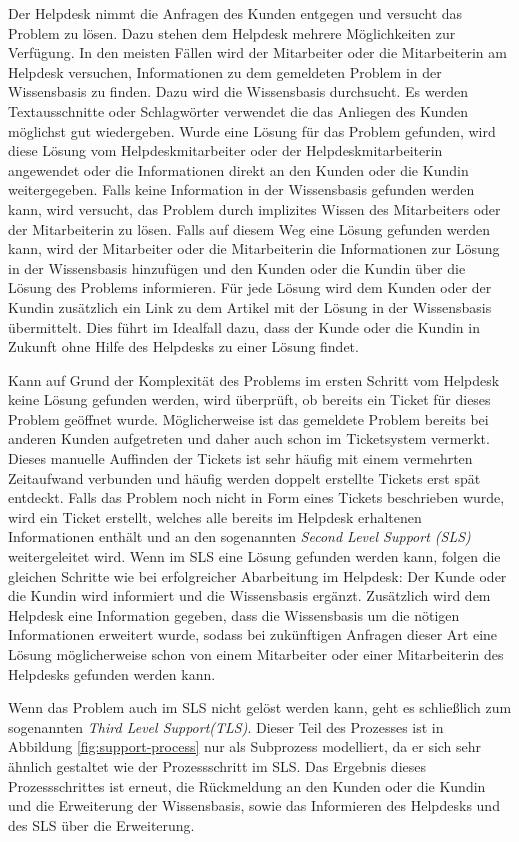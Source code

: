 Der Helpdesk nimmt die Anfragen des Kunden entgegen und versucht das Problem zu lösen. Dazu stehen dem Helpdesk mehrere Möglichkeiten zur Verfügung. In den meisten Fällen wird der Mitarbeiter oder die Mitarbeiterin am Helpdesk versuchen, Informationen zu dem gemeldeten Problem in der Wissensbasis zu finden. Dazu wird die Wissensbasis durchsucht. Es werden Textausschnitte oder Schlagwörter verwendet die das Anliegen des Kunden möglichst gut wiedergeben. Wurde eine Lösung für das Problem gefunden, wird diese Lösung vom Helpdeskmitarbeiter oder der Helpdeskmitarbeiterin angewendet oder die Informationen direkt an den Kunden oder die Kundin weitergegeben. Falls keine Information in der Wissensbasis gefunden werden kann, wird versucht, das Problem durch implizites Wissen des Mitarbeiters oder der Mitarbeiterin zu lösen. Falls auf diesem Weg eine Lösung gefunden werden kann, wird der Mitarbeiter oder die Mitarbeiterin die Informationen zur Lösung in der Wissensbasis hinzufügen und den Kunden oder die Kundin über die Lösung des Problems informieren. Für jede Lösung wird dem Kunden oder der Kundin zusätzlich ein Link zu dem Artikel mit der Lösung in der Wissensbasis übermittelt. Dies führt im Idealfall dazu, dass der Kunde oder die Kundin in Zukunft ohne Hilfe des Helpdesks zu einer Lösung findet.

Kann auf Grund der Komplexität des Problems im ersten Schritt vom Helpdesk keine Lösung gefunden werden, wird überprüft, ob bereits ein Ticket für dieses Problem geöffnet wurde. Möglicherweise ist das gemeldete Problem bereits bei anderen Kunden aufgetreten und daher auch schon im Ticketsystem vermerkt. Dieses manuelle Auffinden der Tickets ist sehr häufig mit einem vermehrten Zeitaufwand verbunden und häufig werden doppelt erstellte Tickets erst spät entdeckt. Falls das Problem noch nicht in Form eines Tickets beschrieben wurde, wird ein Ticket erstellt, welches alle bereits im Helpdesk erhaltenen Informationen enthält und an den sogenannten \textit{Second Level Support (SLS)} weitergeleitet wird. Wenn im SLS eine Lösung gefunden werden kann, folgen die gleichen Schritte wie bei erfolgreicher Abarbeitung im Helpdesk: Der Kunde oder die Kundin wird informiert und die Wissensbasis ergänzt. Zusätzlich wird dem Helpdesk eine Information gegeben, dass die Wissensbasis um die nötigen Informationen erweitert wurde, sodass bei zukünftigen Anfragen dieser Art eine Lösung möglicherweise schon von einem Mitarbeiter oder einer Mitarbeiterin des Helpdesks gefunden werden kann.

Wenn das Problem auch im SLS nicht gelöst werden kann, geht es schließlich zum sogenannten \textit{Third Level Support(TLS)}. Dieser Teil des Prozesses ist in Abbildung \ref{fig:support-process} nur als Subprozess modelliert, da er sich sehr ähnlich gestaltet wie der Prozessschritt im SLS. Das Ergebnis dieses Prozessschrittes ist erneut, die Rückmeldung an den Kunden oder die Kundin und die Erweiterung der Wissensbasis, sowie das Informieren des Helpdesks und des SLS über die Erweiterung.

